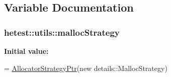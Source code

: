\subsection{Variable Documentation}
\hypertarget{namespacehetest_1_1utils_ac87aad4fed0f78704edd9639dcc44e03}{
\subsubsection[{malloc\-Strategy}]{ hetest\-::utils\-::malloc\-Strategy}}\label{namespacehetest_1_1utils_ac87aad4fed0f78704edd9639dcc44e03}
{\bfseries Initial value\-:}
\begin{DoxyCode}
=
    \hyperlink{namespacehetest_1_1utils_a3f7f347b9f62a88014bdcc45f7987846}{AllocatorStrategyPtr}(\textcolor{keyword}{new} details::MallocStrategy)
\end{DoxyCode}

